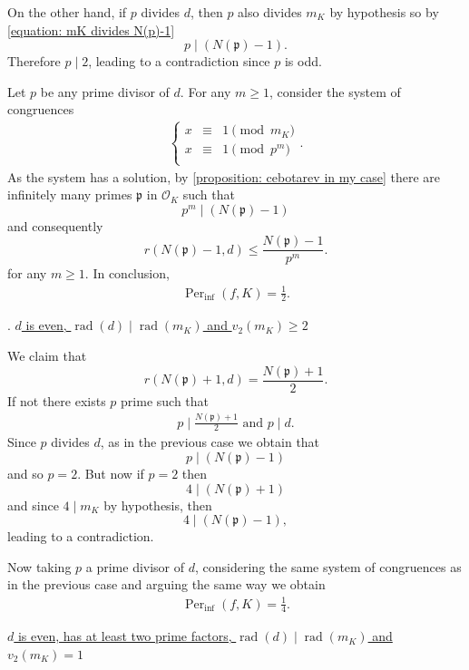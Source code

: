 \documentclass{amsart}
\def\OK{\mathcal{O}_K}
\DeclareMathOperator{\Per}{Per}
\DeclareMathOperator{\rad}{rad}
\theoremstyle{definition}
\begin{document}
On the other hand, if $p$ divides $d$, then $p$ also divides $m_K$ by hypothesis so by \cref{equation: mK divides N(p)-1} $$p \mid (N(\mathfrak{p})-1).$$ Therefore $p \mid 2$, leading to a contradiction since $p$ is odd. 

Let $p$ be any prime divisor of $d$. For any $m \geq 1$, consider the system of congruences
\begin{align*}
\left \{ \begin{matrix} 
x &\equiv & 1 \pmod{m_K} \\
x &\equiv & 1 \pmod{p^m} \\
\end{matrix}\right..
\end{align*}
As the system has a solution, by \cref{proposition: cebotarev in my case} there are infinitely many primes $\mathfrak{p}$ in $\OK$ such that 
$$p^m \mid (N(\mathfrak{p})-1)$$ and consequently $$r(N(\mathfrak{p})-1,d) \leq \frac{N(\mathfrak{p})-1}{p^m}.$$
for any $m \geq 1$.
In conclusion, 
\begin{align*}
\Per_{\inf}(f,K) = \frac{1}{2}.
\end{align*}

\bigskip

. \underline{$d$ is even, $\rad(d) \mid \rad(m_K)$ and $v_2(m_K) \geq 2$}

We claim that $$r(N(\mathfrak{p})+1,d) = \frac{N(\mathfrak{p})+1}{2}.$$ If not there exists $p$ prime such that 
\begin{align*}
p \mid \frac{N(\mathfrak{p})+1}{2} \text{ and } p \mid d.
\end{align*}
Since $p$ divides $d$, as in the previous case we obtain that $$p \mid (N(\mathfrak{p})-1)$$ and so $p = 2$. But now if $p = 2$ then $$4 \mid (N(\mathfrak{p})+1)$$ and since $4 \mid m_K$ by hypothesis, then $$4 \mid (N(\mathfrak{p})-1),$$ leading to a contradiction.

Now taking $p$ a prime divisor of $d$, considering the same system of congruences as in the previous case and arguing the same way we obtain
\begin{align*}
\Per_{\inf}(f,K) = \frac{1}{4}.
\end{align*}

\bigskip

 \underline{$d$ is even, has at least two prime factors, $\rad(d) \mid \rad(m_K)$ and $v_2(m_K) = 1$}
\end{document}
